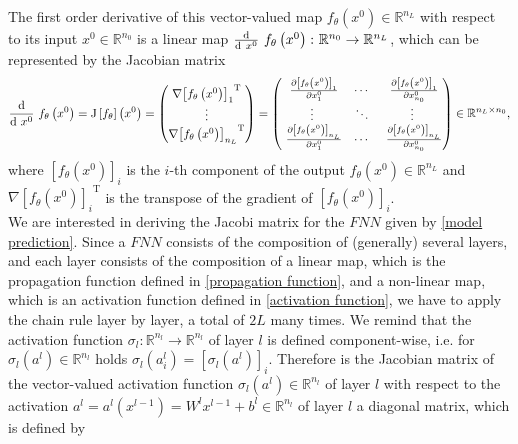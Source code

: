 The first order derivative of this vector-valued map $f_{\theta}\left(x^0\right) \in \mathbb{R}^{n_L}$ with respect to its input $x^0 \in \mathbb{R}^{n_0}$ is a linear map $\frac{\textup{d}}{\textup{d} \ x^0} \  f_{\theta}\left(x^0\right) \colon \mathbb{R}^{n_0} \to \mathbb{R}^{n_L}$, which can be represented by the Jacobian matrix
\begin{equation}
    \label{Jacobi}
    \frac{\textup{d}}{\textup{d} \ x^0} \  f_{\theta}\left(x^0\right) = \mathrm{J} \left[f_{\theta} \right]\left(x^0\right) = \begin{pmatrix} \nabla {\left[f_{\theta}\left(x^0\right)\right]_{1}}^{\mathrm{T}} \\ \vdots \\  \nabla {\left[f_{\theta}\left(x^0\right)\right]_{n_L}}^{\mathrm{T}} \end{pmatrix} = \begin{pmatrix} \ \frac{\partial \left[f_{\theta}\left(x^0\right)\right]_1}{\partial x^0_{1}} & \cdots & \ \frac{\partial \left[f_{\theta}\left(x^0\right)\right]_1}{\partial x^0_{n_0}} \\ \vdots & \ddots & \vdots \\ \ \frac{\partial \left[f_{\theta}\left(x^0\right)\right]_{n_L}}{\partial x^0_{1}} & \cdots & \ \frac{\partial \left[f_{\theta}\left(x^0\right)\right]_{n_L}}{\partial x^0_{n_0}} \end{pmatrix} \in \mathbb{R}^{n_L \times n_0}, 
\end{equation}
where $\left[f_{\theta}\left(x^0\right)\right]_i$ is the $i$-th component of the output $f_{\theta}\left(x^0\right) \in \mathbb{R}^{n_L}$ and $\nabla {\left[f_{\theta}\left(x^0\right)\right]_i}^{\mathrm{T}}$ is the transpose of the gradient of $\left[f_{\theta}\left(x^0\right)\right]_i$. \\
We are interested in deriving the Jacobi matrix for the $FNN$ given by \cref{model prediction}. Since a $FNN$ consists of the composition of (generally) several layers, and each layer consists of the composition of a linear map, which is the propagation function defined in \cref{propagation function}, and a non-linear map, which is an activation function defined in \cref{activation function}, we have to apply the chain rule layer by layer, a total of $2L$ many times. We remind that the activation function $\sigma_{l} \colon \mathbb{R}^{n_l} \to \mathbb{R}^{n_l}$ of layer $l$ is defined component-wise, i.e. for $\sigma_{l}\left(a^l\right) \in \mathbb{R}^{n_l}$ holds $\sigma_{l}\left(a^l_i\right) = \left[ \sigma_{l}\left(a^l\right) \right]_i$. Therefore is the Jacobian matrix of the vector-valued activation function $\sigma_{l}\left(a^l\right) \in \mathbb{R}^{n_l}$ of layer $l$ with respect to the activation $a^l = a^l\left(x^{l-1}\right) = W^{l} x^{l-1} + b^{l} \in \mathbb{R}^{n_l}$ of layer $l$ a diagonal matrix, which is defined by
